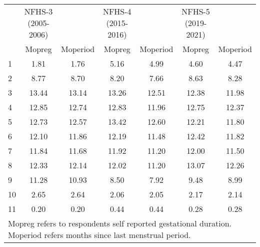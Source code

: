 \begin{tabular}{l*{6}{c}}
\toprule
            &NFHS-3 (2005-2006)&            &NFHS-4 (2015-2016)&            &NFHS-5 (2019-2021)&            \\
            &\multicolumn{1}{c}{Mopreg}&\multicolumn{1}{c}{Moperiod}&\multicolumn{1}{c}{Mopreg}&\multicolumn{1}{c}{Moperiod}&\multicolumn{1}{c}{Mopreg}&\multicolumn{1}{c}{Moperiod}\\
\midrule
\midrule
1           &        1.81&        1.76&        5.16&        4.99&        4.60&        4.47\\
2           &        8.77&        8.70&        8.20&        7.66&        8.63&        8.28\\
3           &       13.44&       13.14&       13.26&       12.51&       12.38&       11.98\\
4           &       12.85&       12.74&       12.83&       11.96&       12.75&       12.37\\
5           &       12.73&       12.57&       13.42&       12.60&       12.21&       11.80\\
6           &       12.10&       11.86&       12.19&       11.48&       12.42&       11.82\\
7           &       11.84&       11.68&       11.92&       11.20&       12.00&       11.50\\
8           &       12.33&       12.14&       12.02&       11.20&       13.07&       12.26\\
9           &       11.28&       10.93&        8.50&        7.92&        9.48&        8.99\\
10          &        2.65&        2.64&        2.06&        2.05&        2.17&        2.14\\
11          &        0.20&        0.20&        0.44&        0.44&        0.28&        0.28\\
\bottomrule
\multicolumn{7}{l}{\footnotesize Mopreg refers to respondents self reported gestational duration. Moperiod refers months since last menstrual period.}\\
\end{tabular}
